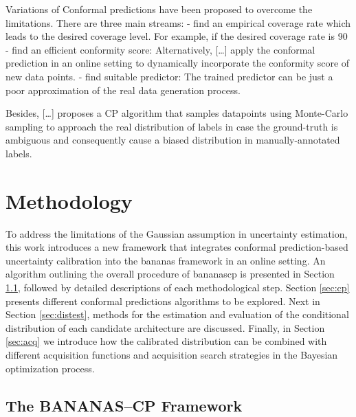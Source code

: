 \documentclass[a4paper,oneside,bibliography=totoc]{scrbook}
\begin{document}
Variations of Conformal predictions have been proposed to overcome the limitations. There are three main streams:
- find an empirical coverage rate which leads to the desired coverage level. For example, if the desired coverage rate is 90%
- find an efficient conformity score: Alternatively, […] apply the conformal prediction in an online setting to dynamically incorporate the conformity score of new data points.
- find suitable predictor: The trained predictor can be just a poor approximation of the real data generation process.

Besides, […] proposes a CP algorithm that samples datapoints using Monte-Carlo sampling to approach the real distribution of labels in case the ground-truth is ambiguous and consequently cause a biased distribution in manually-annotated labels.



\chapter{Methodology}
To address the limitations of the Gaussian assumption in uncertainty estimation, this work introduces a new framework that integrates conformal prediction-based uncertainty calibration into the \gls{bananas} framework in an online setting. An algorithm outlining the overall procedure of \gls{bananascp} is presented in Section \ref{sec:overview}, followed by detailed descriptions of each methodological step. Section \ref{sec:cp} presents different conformal predictions algorithms to be explored. Next in Section \ref{sec:distest}, methods for the estimation and evaluation of the conditional distribution of each candidate architecture are discussed. Finally, in Section \ref{sec:acq} we introduce how the calibrated distribution can be combined with different acquisition functions and acquisition search strategies in the Bayesian optimization process.


\section{The BANANAS--CP Framework}
\label{sec:overview}
\end{document}
